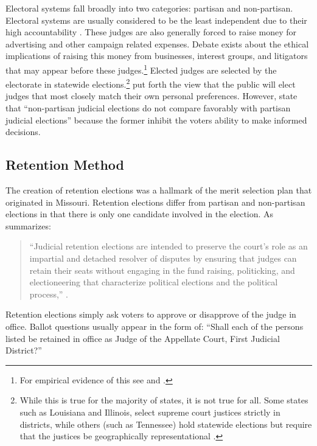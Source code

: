 \documentclass[12pt]{article}
\begin{document}
Electoral systems fall broadly into two categories: partisan and non-partisan.  Electoral systems are usually considered to be the least independent due to their high accountability \citep{Choi2010}. These judges are also generally forced to raise money for advertising and other campaign related expenses.  Debate exists about the ethical implications of raising this money from businesses, interest groups, and litigators that may appear before these judges.\footnote{For empirical evidence of this see \citet{Gibson2008} and \citet{hall2014attacking}.}  Elected judges are selected by the electorate in statewide elections.\footnote{While this is true for the majority of states, it is not true for all.  Some states such as Louisiana and Illinois, select supreme court justices strictly in districts, while others (such as Tennessee) hold statewide elections but require that the justices be geographically representational \citep{Bonneau2010}.}  \citet{Caldarone2009} put forth the view that the public will elect judges that most closely match their own personal preferences.  However, \citet{Debow2013} state that ``non-partisan judicial elections do not compare favorably with partisan judicial elections'' because the former inhibit the voters ability to make informed decisions.

\subsection*{Retention Method}
The creation of retention elections was a hallmark of the merit selection plan that originated in Missouri. Retention elections differ from partisan and non-partisan elections in that there is only one candidate involved in the election. As \citeauthor{Reid1999} summarizes: \begin{quote}``Judicial retention elections are intended to preserve the court’s role as an impartial and detached resolver of disputes by ensuring that judges can retain their seats without engaging in the fund raising, politicking, and electioneering that characterize political elections and the political process,'' \citep[68]{Reid1999}.\end{quote}  Retention elections simply ask voters to approve or disapprove of the judge in office. Ballot questions usually appear in the form of: ``Shall each of the persons listed be retained in office as Judge of the Appellate Court, First Judicial District?''
\end{document}

